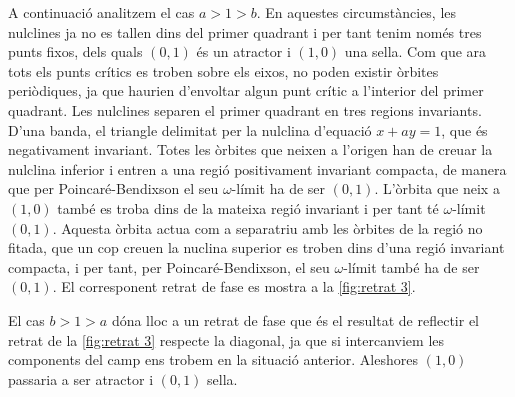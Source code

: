 \documentclass[12pt]{article}
\numberwithin{table}{section}
\numberwithin{equation}{section}
\numberwithin{figure}{section}
\begin{document}
A continuació analitzem el cas \( a > 1 > b \). En aquestes circumstàncies, les nulclines ja no es tallen dins del primer quadrant i per tant tenim només tres punts fixos, dels quals \( (0,1) \) és un atractor i \( (1,0) \) una sella. Com que ara tots els punts crítics es troben sobre els eixos, no poden existir òrbites periòdiques, ja que haurien d'envoltar algun punt crític a l'interior del primer quadrant. Les nulclines separen el primer quadrant en tres regions invariants. D'una banda, el triangle delimitat per la nulclina d'equació \( x + ay = 1 \), que és negativament invariant. Totes les òrbites que neixen a l'origen han de creuar la nulclina inferior i entren a una regió positivament invariant compacta, de manera que per Poincaré-Bendixson el seu \( \omega \)-límit ha de ser \( (0,1) \). L'òrbita que neix a \( (1,0) \) també es troba dins de la mateixa regió invariant i per tant té \( \omega \)-límit \( (0,1) \). Aquesta òrbita actua com a separatriu amb les òrbites de la regió no fitada, que un cop creuen la nuclina superior es troben dins d'una regió invariant compacta, i per tant, per Poincaré-Bendixson, el seu \( \omega \)-límit també ha de ser \( (0,1) \). El corresponent retrat de fase es mostra a la \cref{fig:retrat 3}.

El cas \( b > 1 > a \) dóna lloc a un retrat de fase que és el resultat de reflectir el retrat de la \cref{fig:retrat 3} respecte la diagonal, ja que si intercanviem les components del camp ens trobem en la situació anterior. Aleshores \( (1,0) \) passaria a ser atractor i \( (0,1) \) sella.
\end{document}
